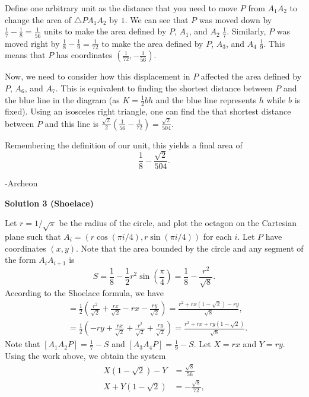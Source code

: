\begin{enumerate}
 Define one arbitrary unit as the distance that you need to move $P$ from $A_1A_2$ to change the area of $\triangle PA_1A_2$ by $1$. We can see that $P$ was moved down by $\frac{1}{7}-\frac{1}{8}=\frac{1}{56}$ units to make the area defined by $P$, $A_1$, and $A_2$ $\frac{1}{7}$. Similarly, $P$ was moved right by $\frac{1}{8}-\frac{1}{9}=\frac{1}{72}$ to make the area defined by $P$, $A_3$, and $A_4$ $\frac{1}{9}$. This means that $P$ has coordinates $(\frac{1}{72},-\frac{1}{56})$.

 Now, we need to consider how this displacement in $P$ affected the area defined by $P$, $A_6$, and $A_7$. This is equivalent to finding the shortest distance between $P$ and the blue line in the diagram (as $K=\frac{1}{2}bh$ and the blue line represents $h$ while $b$ is fixed). Using an isosceles right triangle, one can find the that shortest distance between $P$ and this line is $\frac{\sqrt{2}}{2}(\frac{1}{56}-\frac{1}{72})=\frac{\sqrt{2}}{504}$.

 Remembering the definition of our unit, this yields a final area of
 \[\frac{1}{8}-\frac{\sqrt{2}}{\boxed{504}}.\]

 -Archeon

 



\textbf{Solution 3 (Shoelace)}

Let $r=1/\sqrt{\pi}$ be the radius of the circle, and plot the octagon on the Cartesian plane such that $A_i = (r\cos(\pi i/4),r\sin(\pi i/4))$ for each $i$. Let $P$ have coordinates $(x,y)$. Note that the area bounded by the circle and any segment of the form $A_iA_{i+1}$ is 
 \[S=\frac{1}{8}-\frac{1}{2}r^2\sin\left(\frac{\pi}{4}\right) = \frac{1}{8}-\frac{r^2}{\sqrt{8}}.\]According to the Shoelace formula, we have \begin{align*}[A_1A_2P] &= \frac{1}{2}\left(\frac{r^2}{\sqrt{2}}+\frac{rx}{\sqrt{2}} - rx - \frac{ry}{\sqrt{2}}\right) = \frac{r^2+rx(1-\sqrt{2})-ry}{\sqrt{8}},\\[A_3A_4P] &= \frac{1}{2}\left(-ry+\frac{rx}{\sqrt{2}} + \frac{r^2}{\sqrt{2}} + \frac{ry}{\sqrt{2}}\right) = \frac{r^2+rx+ry(1-\sqrt{2})}{\sqrt{8}}.\end{align*}
Note that $[A_1A_2P] = \frac{1}{7}-S$ and $[A_3A_4P] = \frac{1}{9}-S$. Let $X=rx$ and $Y=ry$. Using the work above, we obtain the system\begin{align*}X(1-\sqrt{2}) - Y &= \frac{\sqrt{8}}{56}\\X+Y(1-\sqrt{2}) &= -\frac{\sqrt{8}}{72},\end{align*}



\end{enumerate}

